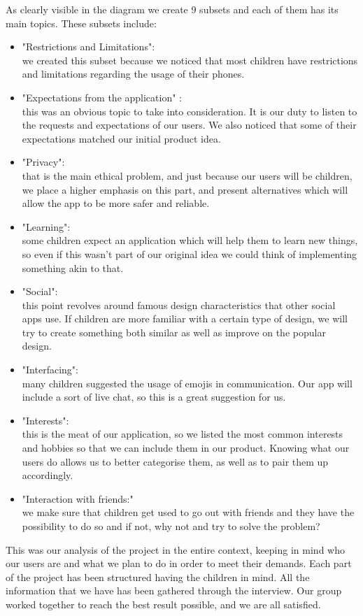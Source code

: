 \documentclass[12pt]{report}
\begin{document}
  As clearly visible in the diagram we create 9 subsets and each of them has its
  main topics. These subsets include:
	\begin{itemize}
		\item "Restrictions and Limitations":\\
		       we created this subset because we noticed that most children have
					 restrictions and limitations regarding the usage of their phones.
		\item "Expectations from the application" :\\
		       this was an obvious topic to take into consideration. It is our duty to listen to the requests and expectations of our users.
					 We also noticed that some of their expectations matched our initial product idea.
		\item "Privacy":\\
		       that is the main ethical problem, and just because our users will be children,
					 we place a higher emphasis on this part, and present alternatives which will allow the app to be more safer and reliable.
		\item "Learning":\\
		       some children expect an application which will help them to learn new things, so even if this wasn't
					 part of our original idea we could think of implementing something akin to that.
		\item "Social":\\
		       this point revolves around famous design characteristics that other social apps use. If children are more familiar
					 with a certain type of design, we will try to create something both similar as well as improve on the popular design.
		\item "Interfacing":\\
		       many children suggested the usage of emojis in communication. Our app will include a sort
					 of live chat, so this is a great suggestion for us.
		\item "Interests":\\
		       this is the meat of our application, so we listed the most common interests and hobbies
					 so that we can include them in our product. Knowing what our users do allows us to better categorise them, as well as to pair them up accordingly.
		\item "Interaction with friends:"\\
		       we make sure that children get used to go out with friends and they have the possibility to do
					 so and if not, why not and try to solve the problem?

	\end{itemize}

	 This was our analysis of the project in the entire context, keeping in mind who our users are and what we
	 plan to do in order to meet their demands. Each part of the project has been structured having the children in mind. All the information that we have has been gathered through the interview. Our group worked together to reach the best result possible, and we are all satisfied.

	
\end{document}
